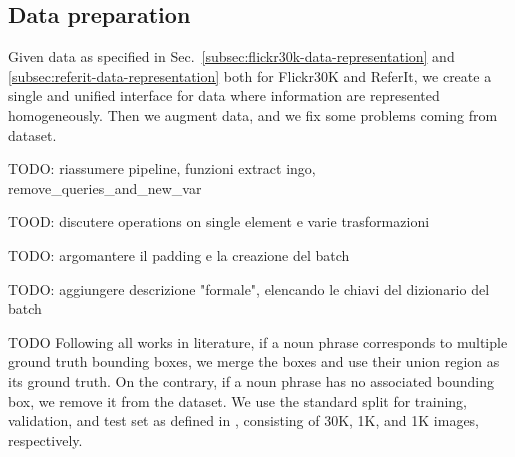 \subsection{Data preparation}

Given data as specified in
Sec.~\ref{subsec:flickr30k-data-representation} and
\ref{subsec:referit-data-representation} both for Flickr30K and
ReferIt, we create a single and unified interface for data where
information are represented homogeneously. Then we augment data, and
we fix some problems coming from dataset.

TODO: riassumere pipeline, funzioni extract ingo, remove\_queries\_and\_new\_var

TOOD: discutere operations on single element e varie trasformazioni

TODO: argomantere il padding e la creazione del batch

TODO: aggiungere descrizione "formale", elencando le chiavi del dizionario del batch

TODO  Following all works in literature, if a noun
phrase corresponds to multiple ground truth bounding boxes, we merge
the boxes and use their union region as its ground truth. On the
contrary, if a noun phrase has no associated bounding box, we remove
it from the dataset. We use the standard split for training,
validation, and test set as defined in  , consisting of 30K, 1K, and 1K images, respectively.
